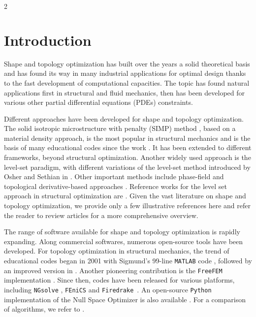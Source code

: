 \documentclass[a4paper, oneside]{article}
\begin{document}
\begin{multicols}{2}

\section{Introduction}

Shape and topology optimization \cite{MR2731611,SokZol92} has built over the years a solid theoretical basis and has found its way in many industrial applications for optimal design thanks to the fast development of computational capacities. 
The topic has found natural applications first  in structural and fluid mechanics, then has been developed for various other partial differential equations (PDEs) constraints. 

Different approaches have been developed for shape and topology optimization. 
The solid isotropic microstructure with penalty (SIMP) method \cite{MR2008524}, based on a material density approach,  is the most popular in structural mechanics and is the basis of many educational codes since the work \cite{Sigmund2014}. 
It has been extended to different frameworks, beyond structural optimization.
Another widely used approach is the level-set paradigm, with different variations of the level-set method introduced by Osher and Sethian in \cite{MR965860}. 
Other important methods include phase-field  \cite{MR2108636} and topological derivative-based approaches \cite{MR2235384}. 
Reference works for the level set approach in structural optimization are \cite{MR1911658,MR2033390}. 
Given the vast literature on shape and topology optimization, we provide only a few illustrative references here and refer the reader to review articles for a more comprehensive overview. 

The range of software available for shape and topology optimization is rapidly expanding.
Along commercial softwares, numerous open-source tools have been developed.
For topology optimization in structural mechanics, the trend of educational codes began in 2001 with Sigmund's 99-line \texttt{MATLAB} code \cite{Sigmund2014}, followed by an improved version in \cite{Andreassen2010}. Another pioneering contribution is the \texttt{FreeFEM} implementation \cite{MR2252743}.
Since then, codes have been released for various platforms, including \texttt{NGsolve} \cite{MR4233697}, \texttt{FEniCS} \cite{fenicsx, BLAUTH2021100646,MR3843884} and \texttt{Firedrake}~\cite{Paganini2021}. 
An open-source \texttt{Python} implementation of the Null Space Optimizer is also available \cite{MR4686093}. For a comparison of algorithms, we refer to \cite{Gain2013}.
 

\end{multicols}
\end{document}
